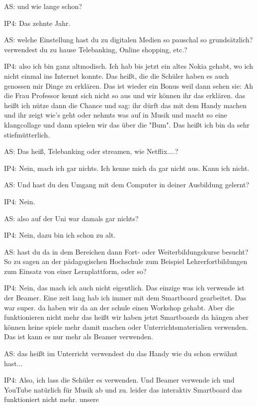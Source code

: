 \documentclass[fontsize=11pt,paper=a4]{scrbook}
\begin{document}
{\begin{itemize*}
\item[AS:]  und wie
lange schon?
\item[IP4:] Das zehnte Jahr.
\item[AS:]  welche Einstellung hast du
zu digitalen Medien so pauschal so
grundsätzlich? verwendest du zu hause Telebanking, Online shopping, etc.?
\item[IP4:]  also ich
bin ganz altmodisch. Ich hab bis jetzt ein altes Nokia gehabt, wo ich nicht einmal ins Internet konnte. Das heißt, die die Schüler haben es  auch genossen mir
Dinge zu erklären. Das ist wieder ein Bonus
weil dann sehen sie: Ah die Frau Professor kennt sich nicht so aus und wir können ihr das erklären.
 das heißt ich nütze dann die Chance und sag: ihr
dürft das mit dem Handy machen und ihr zeigt
wie's geht oder nehmts was auf in Musik und
macht so eine  klangcollage und dann spielen
wir das über die "Bum". Das heißt ich bin da sehr stiefmütterlich.
\item[AS:] Das heiß, Telebanking oder streamen, wie Netflix....?
\item[IP4:] Nein, mach ich gar nichts. Ich kenne mich da gar nicht aus. Kann ich nicht.
\item[AS:] Und hast du den Umgang mit dem Computer in deiner
Ausbildung gelernt?
\item[IP4:] Nein.
\item[AS:] also auf der Uni war
damals gar nichts?
\item[IP4:] Nein, dazu bin ich schon zu alt.
\item[AS:] 
hast du da in dem Bereichen dann Fort- oder
Weiterbildungskurse besucht? So zu sagen an der pädagogischen Hochschule zum
Beispiel Lehrerfortbildungen zum Einsatz
von einer Lernplattform, oder so?
\item[IP4:] Nein, das mach ich auch nicht eigentlich. Das einzige was ich verwende ist
der Beamer. Eine zeit lang hab ich immer mit dem Smartboard gearbeitet. Das war super. da haben wir da an der
schule einen Workshop gehabt. Aber die
funktionieren nicht mehr das heißt wir
haben jetzt Smartboards da hängen aber
können keine spiele mehr damit machen oder Unterrichtsmaterialien verwenden. Das ist kann es nur mehr als Beamer verwenden.
\item[AS:] das heißt im Unterricht verwendest du
das Handy wie du schon erwähnt hast...
\item[IP4:] Also, ich lass die Schüler es verwenden. Und Beamer verwende ich und YouTube natürlich für
Musik ab und zu. leider das interaktiv Smartboard das funktioniert nicht mehr. unsere

\end{itemize*}}
\end{document}
